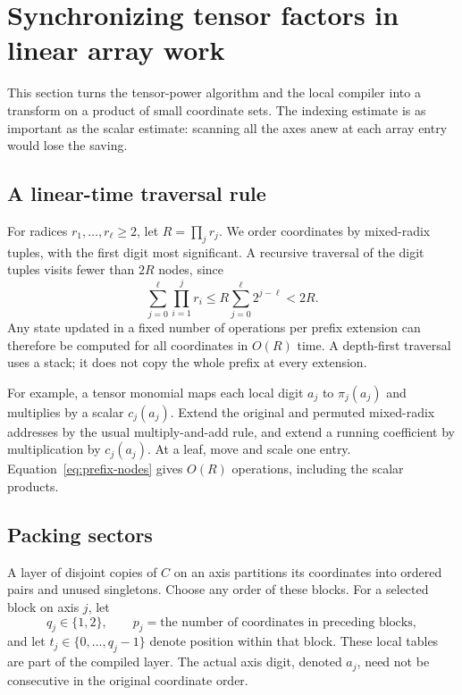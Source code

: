 \section{Synchronizing tensor factors in linear array work}
\label{sec:synchronization}

This section turns the tensor-power algorithm and the local compiler into a transform on a product of small coordinate sets. The indexing estimate is as important as the scalar estimate: scanning all the axes anew at each array entry would lose the saving.

\subsection{A linear-time traversal rule}

For radices $r_1,\ldots,r_\ell\ge2$, let $R=\prod_jr_j$. We order coordinates by mixed-radix tuples, with the first digit most significant. A recursive traversal of the digit tuples visits fewer than $2R$ nodes, since
\begin{equation}\label{eq:prefix-nodes}
 \sum_{j=0}^{\ell}\prod_{i=1}^{j}r_i
 \le R\sum_{j=0}^{\ell}2^{j-\ell}<2R.
\end{equation}
Any state updated in a fixed number of operations per prefix extension can therefore be computed for all coordinates in $O(R)$ time. A depth-first traversal uses a stack; it does not copy the whole prefix at every extension.

For example, a tensor monomial maps each local digit $a_j$ to $\pi_j(a_j)$ and multiplies by a scalar $c_j(a_j)$. Extend the original and permuted mixed-radix addresses by the usual multiply-and-add rule, and extend a running coefficient by multiplication by $c_j(a_j)$. At a leaf, move and scale one entry. Equation~\eqref{eq:prefix-nodes} gives $O(R)$ operations, including the scalar products.

\subsection{Packing sectors}

A layer of disjoint copies of $C$ on an axis partitions its coordinates into ordered pairs and unused singletons. Choose any order of these blocks. For a selected block on axis $j$, let
\[
 q_j\in\{1,2\},\qquad
 p_j=\text{the number of coordinates in preceding blocks},
\]
and let $t_j\in\{0,\ldots,q_j-1\}$ denote position within that block. These local tables are part of the compiled layer. The actual axis digit, denoted $a_j$, need not be consecutive in the original coordinate order.

